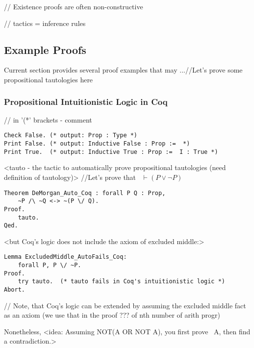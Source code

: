 \documentclass[article]{aaltoseries}
\begin{document}

// Existence proofs are often non-constructive


// tactics = inference rules



\subsection{Example Proofs}

Current section provides several proof examples that may ...//Let's prove some propositional tautologies here

\subsubsection{Propositional Intuitionistic Logic in Coq}

// in '(*' brackets - comment
\begin{lstlisting}[language=coq,caption={Definition of basic propositional terms in Coq}]
Check False. (* output: Prop : Type *)
Print False. (* output: Inductive False : Prop :=  *)
Print True.  (* output: Inductive True : Prop :=  I : True *)
\end{lstlisting}


<tauto - the tactic to automatically prove propositional tautologies (need definition of tautology)>
//Let's prove that ~$\vdash (P \lor \neg P) $
\begin{lstlisting}[language=coq]
Theorem DeMorgan_Auto_Coq : forall P Q : Prop, 
    ~P /\ ~Q <-> ~(P \/ Q).
Proof.
    tauto.
Qed.
\end{lstlisting}


<but Coq's logic does not include the axiom of excluded middle:>
\begin{lstlisting}[language=coq]
Lemma ExcludedMiddle_AutoFails_Coq:
    forall P, P \/ ~P.
Proof.
    try tauto.  (* tauto fails in Coq's intuitionistic logic *)
Abort.
\end{lstlisting}

// Note, that Coq's logic can be extended by assuming the excluded middle fact as an axiom (we use that in the proof ??? of nth number of arith progr)

Nonetheless, <idea: Assuming NOT(A OR NOT A), you first prove ~A, then find a contradiction.>
\end{document}
